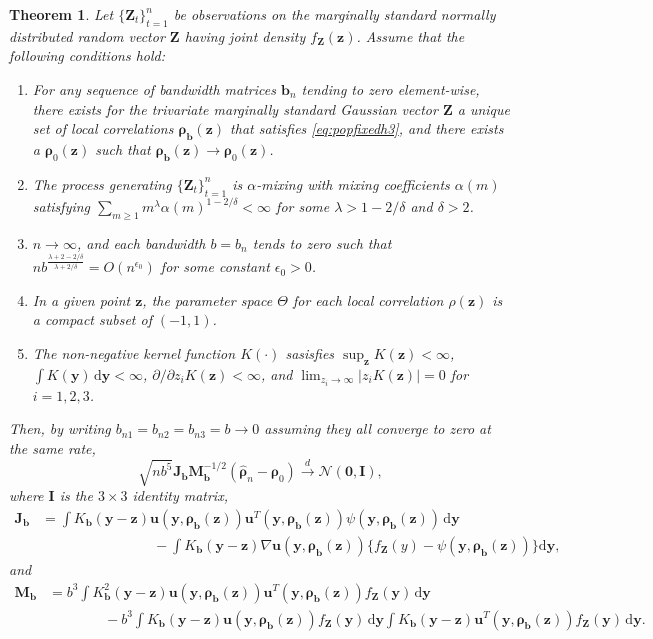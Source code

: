 \documentclass[
  12pt,
  letterpaper]{article}
\providecommand{\tightlist}{%
  \setlength{\itemsep}{0pt}\setlength{\parskip}{0pt}}
\newcommand{\Z}{\bm{Z}}
\newcommand{\z}{\bm{z}}
\newcommand{\y}{\bm{y}}
\newcommand{\fu}{\bm{u}}
\newcommand{\frho}{\bm{\rho}}
\newcommand{\hfrho}{\widehat{\bm{\rho}}}
\newcommand{\hh}{\bm{b}}
\newcommand{\Jb}{\bm{J}_{\hh}}
\newcommand{\Mb}{\bm{M}_{\hh}}
\newtheorem{theorem}{Theorem}[section]
\theoremstyle{definition}
\theoremstyle{definition}
\theoremstyle{definition}
\theoremstyle{remark}
\begin{document}
\begin{theorem}
\protect\hypertarget{thm:loccor3}{}{\label{thm:loccor3} }Let \(\{\Z_t\}_{t=1}^n\) be observations on the marginally standard normally distributed random vector \(\Z\) having joint density \(f_{\Z}(\z)\). Assume that the following conditions hold:

\begin{enumerate}
\def\labelenumi{\arabic{enumi}.}
\tightlist
\item
  For any sequence of bandwidth matrices \(\hh_n\) tending to zero element-wise, there exists for the trivariate marginally standard Gaussian vector \(\Z\) a unique set of local correlations \(\frho_{\hh}(\z)\) that satisfies \eqref{eq:popfixedh3}, and there exists a \(\frho_0(\z)\) such that \(\frho_{\hh}(\z) \rightarrow \frho_0(\z)\).
\item
  The process generating \(\{\Z_t\}_{t=1}^n\) is \(\alpha\)-mixing with mixing coefficients \(\alpha(m)\) satisfying \(\sum_{m\geq1}m^{\lambda}\alpha(m)^{1-2/\delta} < \infty\) for some \(\lambda > 1-2/\delta\) and \(\delta>2\).
\item
  \(n\rightarrow\infty\), and each bandwidth \(b = b_n\) tends to zero such that \(nb^{\frac{\lambda+2-2/\delta}{\lambda + 2/\delta}} = O(n^{\epsilon_0})\) for some constant \(\epsilon_0 > 0\).
\item
  In a given point \(\z\), the parameter space \(\Theta\) for each local correlation \(\rho(\z)\) is a compact subset of \((-1,1)\).
\item
  The non-negative kernel function \(K(\cdot)\) sasisfies \(\sup_{\z}K(\z) < \infty\), \(\int K(\y)\,\textrm{d}\y < \infty\), \(\partial/\partial z_iK(\z) <\infty\), and \(\lim_{z_i \rightarrow \infty}|z_iK(\z)| = 0\) for \(i = 1,2,3\).
\end{enumerate}

Then, by writing \(b_{n1} = b_{n2} = b_{n3} = b \rightarrow 0\) assuming they all converge to zero at the same rate,
\begin{equation}
\sqrt{nb^5}\Jb\Mb^{-1/2}\left(\hfrho_n - \frho_0\right) \stackrel{d}{\rightarrow} \mathcal{N}(\bm{0}, \bm{I}),
\label{eq:an3}
\end{equation}
where \(\bm{I}\) is the \(3\times3\) identity matrix,
\begin{align*}
\Jb &= \int K_{\hh}(\y - \z)\fu(\y, \frho_{\hh}(\z))\fu^T(\y, \frho_{\hh}(\z))\psi(\y,\frho_{\hh}(\z))\,\textrm{d}\y \\
& \qquad\qquad\qquad\qquad - \int K_{\hh}(\y - \z)\nabla\fu(\y,\frho_{\hh}(\z))\Big\{f_{\Z}(y) - \psi(\y,\frho_{\hh}(\z))\Big\}\textrm{d}\y,
\end{align*}
and
\begin{align*}
\Mb &= b^3\int K^2_{\hh}(\y - \z)\fu(\y, \frho_{\hh}(\z))\fu^T(\y,\frho_{\hh}(\z))f_{\Z}(\y)\,\textrm{d}\y \\
& \qquad\qquad - b^3\int K_{\hh}(\y - \z)\fu(\y, \frho_{\hh}(\z))f_{\Z}(\y)\,\textrm{d}\y \int K_{\hh}(\y - \z)\fu^T(\y, \frho_{\hh}(\z))f_{\Z}(\y)\,\textrm{d}\y.
\end{align*}
\end{theorem}
\end{document}
